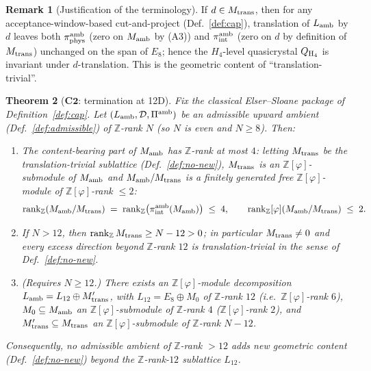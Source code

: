\documentclass[11pt, a4paper]{amsart}
\newtheorem{theorem}{Theorem}[section]
\theoremstyle{definition}
\newtheorem{remark}[theorem]{Remark}
\newcommand{\Z}{\mathbb{Z}}
\newcommand{\rk}{\operatorname{rank}}
\newcommand{\Ophi}{\mathbb{Z}[\varphi]}
\begin{document}
\begin{remark}[Justification of the terminology]
\label{rmk:trans-triv-justif}
If $d \in M_{\rm trans}$, then for any
acceptance-window-based cut-and-project
(Def.~\ref{def:cap}), translation of $L_{\rm amb}$ by $d$
leaves both $\pi_{\rm phys}^{\rm amb}$ (zero on $M_{\rm amb}$
by (A3)) and $\pi_{\rm int}^{\rm amb}$ (zero on $d$ by
definition of $M_{\rm trans}$) unchanged on the span of
$E_8$; hence the $H_4$-level quasicrystal $Q_{\rm H_4}$ is
invariant under $d$-translation. This is the geometric
content of ``translation-trivial''.
\end{remark}

\begin{theorem}[$\mathbf{C2}$: termination at 12D]
\label{thm:C2}
Fix the classical Elser--Sloane package of
Definition~\ref{def:cap}. Let $(L_{\rm amb}, \mathcal{D},
\Pi^{\rm amb})$ be an admissible upward ambient
(Def.~\ref{def:admissible}) of $\Z$-rank $N$ (so $N$ is even
and $N \geq 8$). Then:
\begin{enumerate}
\item[\textup{(i)}] The content-bearing part of $M_{\rm amb}$
  has $\Z$-rank at most $4$: letting $M_{\rm trans}$ be the
  translation-trivial sublattice (Def.~\ref{def:no-new}),
  $M_{\rm trans}$ is an $\Ophi$-submodule of $M_{\rm amb}$ and
  $M_{\rm amb} / M_{\rm trans}$ is a finitely generated free
  $\Ophi$-module of $\Ophi$-rank $\leq 2$:
  \[
    \rk_\Z(M_{\rm amb} / M_{\rm trans})
    \;=\; \rk_\Z\bigl(\pi_{\rm int}^{\rm amb}(M_{\rm amb})\bigr)
    \;\leq\; 4,
    \qquad
    \rk_\Ophi(M_{\rm amb} / M_{\rm trans}) \;\leq\; 2.
  \]
\item[\textup{(ii)}] If $N > 12$, then $\rk_\Z M_{\rm trans}
  \geq N - 12 > 0$; in particular $M_{\rm trans} \neq 0$ and
  every excess direction beyond $\Z$-rank $12$ is
  translation-trivial in the sense of
  Def.~\ref{def:no-new}.
\item[\textup{(iii)}] \emph{(Requires $N \geq 12$.)} There
  exists an $\Ophi$-module decomposition $L_{\rm amb} = L_{12}
  \oplus M_{\rm trans}'$, with $L_{12} = E_8 \oplus M_0$ of
  $\Z$-rank $12$ (i.e.\ $\Ophi$-rank $6$), $M_0 \subseteq
  M_{\rm amb}$ an $\Ophi$-submodule of $\Z$-rank $4$
  ($\Ophi$-rank $2$), and $M_{\rm trans}' \subseteq M_{\rm
  trans}$ an $\Ophi$-submodule of $\Z$-rank $N - 12$.
\end{enumerate}
Consequently, no admissible ambient of $\Z$-rank $> 12$ adds
new geometric content (Def.~\ref{def:no-new}) beyond the
$\Z$-rank-$12$ sublattice $L_{12}$.
\end{theorem}
\end{document}
